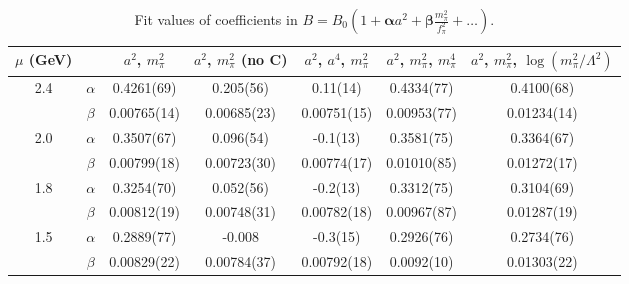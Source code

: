 \documentclass[12pt]{extarticle}
\begin{document}
\begin{table}[h!]
\begin{center}
\begin{tabular}{|c c|c|c|c|c|c|}
\hline
$\mu$ (GeV) &  & $a^2$, $m_\pi^2$& $a^2$, $m_\pi^2$ (no C)& $a^2$, $a^4$, $m_\pi^2$& $a^2$, $m_\pi^2$, $m_\pi^4$& $a^2$, $m_\pi^2$, $\log(m_\pi^2/\Lambda^2)$\\
\hline
\multirow{2}{0.5in}{2.4} & $\alpha$ & 0.4261(69)& 0.205(56)& 0.11(14)& 0.4334(77)& 0.4100(68)\\
 & $\beta$ & 0.00765(14)& 0.00685(23)& 0.00751(15)& 0.00953(77)& 0.01234(14)\\
\hline
\multirow{2}{0.5in}{2.0} & $\alpha$ & 0.3507(67)& 0.096(54)& -0.1(13)& 0.3581(75)& 0.3364(67)\\
 & $\beta$ & 0.00799(18)& 0.00723(30)& 0.00774(17)& 0.01010(85)& 0.01272(17)\\
\hline
\multirow{2}{0.5in}{1.8} & $\alpha$ & 0.3254(70)& 0.052(56)& -0.2(13)& 0.3312(75)& 0.3104(69)\\
 & $\beta$ & 0.00812(19)& 0.00748(31)& 0.00782(18)& 0.00967(87)& 0.01287(19)\\
\hline
\multirow{2}{0.5in}{1.5} & $\alpha$ & 0.2889(77)& -0.008& -0.3(15)& 0.2926(76)& 0.2734(76)\\
 & $\beta$ & 0.00829(22)& 0.00784(37)& 0.00792(18)& 0.0092(10)& 0.01303(22)\\
\hline
\end{tabular}
\caption{Fit values of coefficients in $B = B_0(1 + \mathbf{\alpha} a^2 + \mathbf{\beta} \frac{m_\pi^2}{f_\pi^2} + \ldots)$.}
\end{center}
\end{table}




















\clearpage
\end{document}
